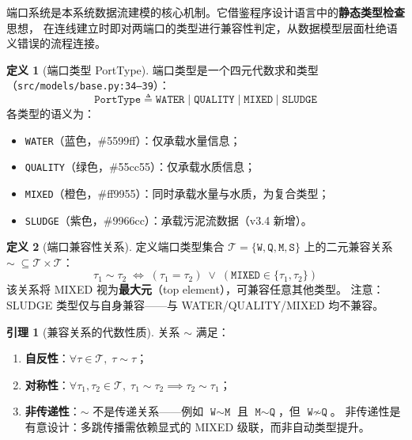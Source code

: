 \documentclass[12pt,a4paper]{ctexart}
\theoremstyle{definition}
\newtheorem{definition}{定义}[section]
\newtheorem{lemma}[theorem]{引理}
\theoremstyle{remark}
\begin{document}
端口系统是本系统数据流建模的核心机制。它借鉴程序设计语言中的\textbf{静态类型检查}思想，
在连线建立时即对两端口的类型进行兼容性判定，从数据模型层面杜绝语义错误的流程连接。

\begin{definition}[端口类型 PortType]
\label{def:porttype}
端口类型是一个四元代数求和类型（\texttt{src/models/base.py:34--39}）：
\[
\texttt{PortType} \triangleq \texttt{WATER} \mid \texttt{QUALITY} \mid \texttt{MIXED} \mid \texttt{SLUDGE}
\]
各类型的语义为：
\begin{itemize}
  \item \texttt{WATER}（蓝色，\#5599ff）：仅承载水量信息；
  \item \texttt{QUALITY}（绿色，\#55cc55）：仅承载水质信息；
  \item \texttt{MIXED}（橙色，\#ff9955）：同时承载水量与水质，为复合类型；
  \item \texttt{SLUDGE}（紫色，\#9966cc）：承载污泥流数据（v3.4 新增）。
\end{itemize}
\end{definition}

\begin{definition}[端口兼容性关系]
\label{def:compatibility}
定义端口类型集合 $\mathcal{T} = \{\texttt{W}, \texttt{Q}, \texttt{M}, \texttt{S}\}$ 上的二元兼容关系 $\sim\; \subseteq \mathcal{T} \times \mathcal{T}$：
\[
\tau_1 \sim \tau_2 \;\iff\; (\tau_1 = \tau_2) \;\lor\; (\texttt{MIXED} \in \{\tau_1, \tau_2\})
\]
该关系将 MIXED 视为\textbf{最大元}（top element），可兼容任意其他类型。
注意：SLUDGE 类型仅与自身兼容——与 WATER/QUALITY/MIXED 均不兼容。
\end{definition}

\begin{lemma}[兼容关系的代数性质]
\label{lem:compat-properties}
关系 $\sim$ 满足：
\begin{enumerate}
  \item \textbf{自反性}：$\forall \tau \in \mathcal{T},\; \tau \sim \tau$；
  \item \textbf{对称性}：$\forall \tau_1, \tau_2 \in \mathcal{T},\; \tau_1 \sim \tau_2 \implies \tau_2 \sim \tau_1$；
  \item \textbf{非传递性}：$\sim$ 不是传递关系——例如 $\texttt{W} \sim \texttt{M}$ 且 $\texttt{M} \sim \texttt{Q}$，但 $\texttt{W} \not\sim \texttt{Q}$。
        非传递性是有意设计：多跳传播需依赖显式的 MIXED 级联，而非自动类型提升。
\end{enumerate}
\end{lemma}
\end{document}
